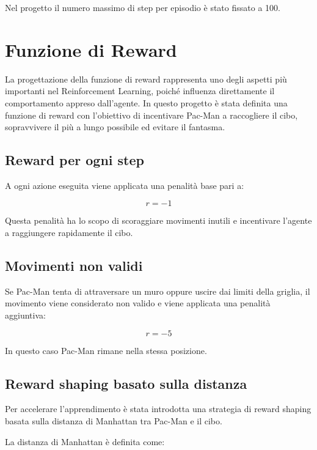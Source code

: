 \documentclass[12pt,a4paper]{report}
\begin{document}
Nel progetto il numero massimo di step per episodio è stato fissato a 100.

\chapter{Funzione di Reward}

La progettazione della funzione di reward rappresenta uno degli aspetti più importanti nel Reinforcement Learning, poiché influenza direttamente il comportamento appreso dall’agente. In questo progetto è stata definita una funzione di reward con l’obiettivo di incentivare Pac-Man a raccogliere il cibo, sopravvivere il più a lungo possibile ed evitare il fantasma.

\section{Reward per ogni step}

A ogni azione eseguita viene applicata una penalità base pari a:

\begin{equation}
r = -1
\end{equation}

Questa penalità ha lo scopo di scoraggiare movimenti inutili e incentivare l’agente a raggiungere rapidamente il cibo.

\section{Movimenti non validi}

Se Pac-Man tenta di attraversare un muro oppure uscire dai limiti della griglia, il movimento viene considerato non valido e viene applicata una penalità aggiuntiva:

\begin{equation}
r = -5
\end{equation}

In questo caso Pac-Man rimane nella stessa posizione.

\section{Reward shaping basato sulla distanza}

Per accelerare l’apprendimento è stata introdotta una strategia di reward shaping basata sulla distanza di Manhattan tra Pac-Man e il cibo.

La distanza di Manhattan è definita come:
\end{document}
